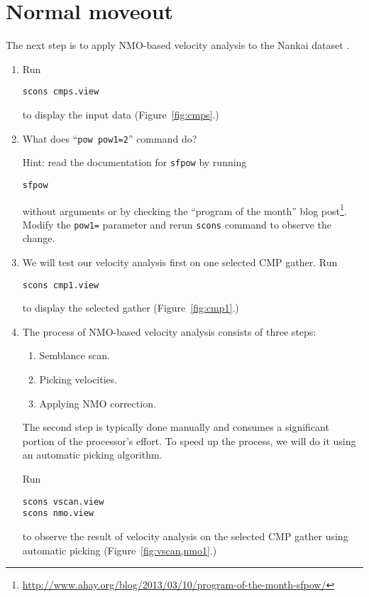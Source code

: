 \section{Normal moveout}

The next step is to apply NMO-based velocity
analysis to the Nankai dataset \cite[]{CSI00-00-00010213}.

\begin{enumerate}          
\item Run
\begin{verbatim}
scons cmps.view 
\end{verbatim}
to display the input data (Figure~\ref{fig:cmps}.)

\item What does ``\texttt{pow pow1=2}'' command do? 

Hint: read the documentation for \texttt{sfpow} by running
\begin{verbatim}
sfpow
\end{verbatim}
without arguments or by checking the ``program of the month'' blog
post\footnote{\url{http://www.ahay.org/blog/2013/03/10/program-of-the-month-sfpow/}}. Modify
the \texttt{pow1=} parameter and rerun \texttt{scons} command to
observe the change.


\item We will test our velocity analysis first on one selected CMP gather. Run
\begin{verbatim}
scons cmp1.view
\end{verbatim}
to display the selected gather (Figure~\ref{fig:cmp1}.)


\item The process of NMO-based velocity analysis consists of three steps:
\begin{enumerate}
\item Semblance scan.
\item Picking velocities.
\item Applying NMO correction.
\end{enumerate}
The second step is typically done manually and consumes a significant
portion of the processor's effort. To speed up the process, we will do
it using an automatic picking algorithm.

Run
\begin{verbatim}
scons vscan.view
scons nmo.view
\end{verbatim}
to observe the result of velocity analysis on the selected CMP gather
using automatic picking (Figure~\ref{fig:vscan,nmo1}.)


\end{enumerate}
